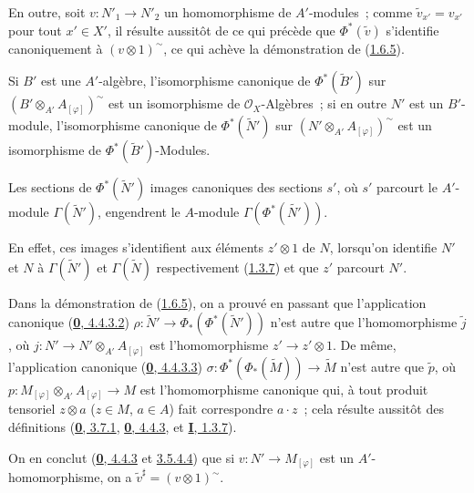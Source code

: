 En outre, soit $v:N'_1\to N'_2$ un homomorphisme de $A'$-modules~; comme
$\widetilde{v}_{x'}=v_{x'}$ pour tout $x'\in X'$, il résulte aussitôt de ce
qui précède que $\Phi^*(\widetilde{v})$ s'identifie canoniquement à
$(v\otimes 1)^{\sim}$, ce qui achève la démonstration de
(\hyperref[I.1.6.5-fr]{1.6.5}).

Si $B'$ est une $A'$-algèbre, l'isomorphisme canonique de
$\Phi^*(\widetilde{B}')$ sur
$(B'\otimes_{A'}A_{[\varphi]})^{\sim}$ est un isomorphisme de
$\mathscr{O}_X$-Algèbres~; si en outre $N'$ est un $B'$-module,
l'isomorphisme canonique de $\Phi^*(\widetilde{N}')$ sur
$(N'\otimes_{A'}A_{[\varphi]})^{\sim}$ est un isomorphisme de
$\Phi^*(\widetilde{B}')$-Modules.

\begin{corollary}[1.6.6]
\label{I.1.6.6-fr}
Les sections de $\Phi^*(\widetilde{N}')$ images canoniques des sections $s'$,
où $s'$ parcourt le $A'$-module $\Gamma(\widetilde{N}')$, engendrent le
$A$-module $\Gamma(\Phi^*(\widetilde{N'}))$.
\end{corollary}

En effet, ces images s'identifient aux éléments $z'\otimes 1$ de $N$,
lorsqu'on identifie $N'$ et $N$ à $\Gamma(\widetilde{N}')$ et
$\Gamma(\widetilde{N})$ respectivement (\hyperref[I.1.3.7-fr]{1.3.7}) et
que $z'$ parcourt $N'$.

\begin{env}[1.6.7]
\label{I.1.6.7-fr}
Dans la démonstration de (\hyperref[I.1.6.5-fr]{1.6.5}), on a prouvé en
passant que l'application canonique
(\hyperref[0.4.4.3.2-fr]{\textbf{0}, 4.4.3.2})
$\rho:\widetilde{N}'\to\Phi_*(\Phi^*(\widetilde{N}'))$ n'est autre que
l'homomorphisme $\widetilde{j}$,
où $j:N'\to N'\otimes_{A'}A_{[\varphi]}$ est l'homomorphisme
$z'\to z'\otimes 1$. De même, l'application canonique
(\hyperref[0.4.4.3.3-fr]{\textbf{0}, 4.4.3.3})
$\sigma:\Phi^*(\Phi_*(\widetilde{M}))\to\widetilde{M}$ n'est autre que
$\widetilde{p}$, où
$p:M_{[\varphi]}\otimes_{A'}A_{[\varphi]}\to M$ est l'homomorphisme
canonique qui, à tout produit tensoriel $z\otimes a$ ($z\in M$, $a\in A$)
fait correspondre $a\cdot z$~; cela résulte aussitôt des définitions
(\hyperref[0.3.7.1-fr]{\textbf{0}, 3.7.1},
\hyperref[0.4.4.3-fr]{\textbf{0}, 4.4.3}, et
\hyperref[I.1.3.7-fr]{\textbf{I}, 1.3.7}).

On en conclut (\hyperref[0.4.4.3-fr]{\textbf{0}, 4.4.3} et
\hyperref[0.3.5.4.4-fr]{3.5.4.4}) que si
$v:N'\to M_{[\varphi]}$ est un $A'$-homomorphisme, on a
$\widetilde{v}^{\sharp}=(v\otimes 1)^{\sim}$.
\end{env}

